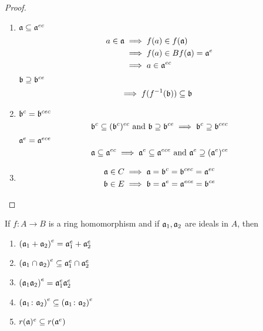 \begin{proof} \
	\begin{enumerate}
		\item
			\(\mathfrak{a} \subseteq \mathfrak{a}^{ec}\)
			\begin{align*}
				a \in \mathfrak{a} &\implies f(a) \in f(\mathfrak{a}) \\
				&\implies f(a) \in Bf(\mathfrak{a}) = \mathfrak{a}^e \\
				&\implies a \in \mathfrak{a}^{ec}
			\end{align*}
			\(\mathfrak{b} \supseteq \mathfrak{b}^{ce}\)
			\begin{align*}
				&\implies  f(f^{-1}(\mathfrak{b})) \subseteq \mathfrak{b}
			\end{align*}
		\item
			\(\mathfrak{b}^{c} = \mathfrak{b}^{cec}\)
			\begin{align*}
				\mathfrak{b}^c \subseteq (\mathfrak{b}^c)^{ec} \text{ and }
				\mathfrak{b} \supseteq \mathfrak{b}^{ce} \implies \mathfrak{b}^c \supseteq \mathfrak{b}^{cec}
			\end{align*}
			\(\mathfrak{a}^{e} = \mathfrak{a}^{ece}\)
			\begin{align*}
				\mathfrak{a} \subseteq \mathfrak{a}^{ec} \implies \mathfrak{a}^e \subseteq \mathfrak{a}^{ece}
				\text{ and } \mathfrak{a}^{e} \supseteq (\mathfrak{a}^e)^{ce}
			\end{align*}
		\item
			\begin{align*}
				\mathfrak{a} \in C &\implies \mathfrak{a} = \mathfrak{b}^c = \mathfrak{b}^{cec} = \mathfrak{a}^{ec} \\
				\mathfrak{b} \in E &\implies \mathfrak{b} = \mathfrak{a}^e = \mathfrak{a}^{ece} = \mathfrak{b}^{ce}
			\end{align*}
	\end{enumerate}
\end{proof}

\begin{proposition}{}{}
	If \(f\colon A \to B\) is a ring homomorphism and
	if \(\mathfrak{a}_1, \mathfrak{a}_2\) are ideals in \(A\),
	then
	\begin{enumerate}
		\item \(\left( \mathfrak{a}_1 + \mathfrak{a}_2 \right)^e = \mathfrak{a}_1^e + \mathfrak{a}_2^e\)
		\item \(\left( \mathfrak{a}_1 \cap \mathfrak{a}_2 \right)^e \subseteq \mathfrak{a}_1^e \cap \mathfrak{a}_2^e\)
		\item \(\left( \mathfrak{a}_1 \mathfrak{a}_2 \right)^e = \mathfrak{a}_1^e \mathfrak{a}_2^e\)
		\item \(\left( \mathfrak{a}_1 \colon \mathfrak{a}_2 \right)^e
			\subseteq \left( \mathfrak{a}_1 \colon \mathfrak{a}_2 \right)^e\)
		\item \(r(\mathfrak{a})^e \subseteq r(\mathfrak{a}^e)\)
	\end{enumerate}
\end{proposition}

